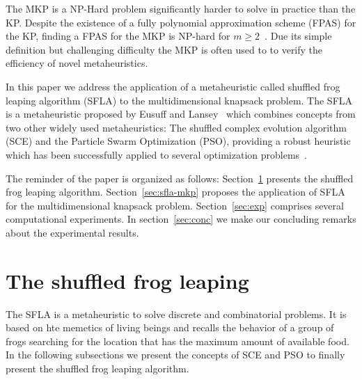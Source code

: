 \documentclass[10pt, conference, compsocconf]{IEEEtran}
\begin{document}
The MKP is a NP-Hard problem significantly harder to solve in practice than the KP.
Despite the existence of a fully polynomial approximation scheme (FPAS) for the KP,
finding a FPAS for the MKP is NP-hard for $m \geqslant 2$~\cite{magazine1984note}.
Due its simple definition but challenging difficulty the MKP is often used to
to verify the efficiency of novel metaheuristics.


In this paper we address the application of a metaheuristic called shuffled
frog leaping algorithm (SFLA) to the multidimensional knapsack problem.
The SFLA is a metaheuristic proposed by Eusuff and Lansey~\cite{eusuff2003optimization, eusuff2006shuffled}
which combines concepts from two other widely used metaheuristics:
The shuffled complex evolution algorithm (SCE) and the 
Particle Swarm Optimization (PSO), providing a robust heuristic which has been
successfully applied to several optimization problems~\cite{bhattacharjee2014shuffled,
horng2014construction, xu2013effective, fang2012effective, luo2014improved}.

The reminder of the paper is organized as follows:
Section~\ref{sec:sfla} presents the shuffled frog leaping algorithm.
Section~\ref{sec:sfla-mkp} proposes the application of SFLA for the multidimensional
knapsack problem.
Section~\ref{sec:exp} comprises several computational experiments.
In section~\ref{sec:conc} we make our concluding remarks about the experimental
results.

\section{The shuffled frog leaping}
\label{sec:sfla}

The SFLA is a metaheuristic to solve discrete and combinatorial problems.
It is based on hte memetics of living beings and recalls the behavior of a
group of frogs searching for the location that has the maximum amount of available food.
In the following subsections we present the concepts of SCE and PSO to finally
present the shuffled frog leaping algorithm.
\end{document}
